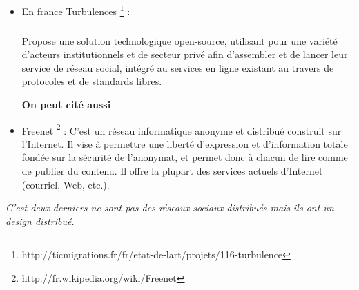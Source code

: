 \begin{itemize}
1) Tent vous permet de sauvegarder vos données dans une place dont vous avez le contrôle. 

2) Vous pouvez choisir un fournisseur d'hébergement ou lancer votre propre serveur.

3) Si vous souhaitez déplacer les hosts vous aurez vos données et relations.
\begin{itemize}
  \item tent utilise https et JSON pour transporter les posts entre les serveurs et les apps.
\item les entités sont les utilisateurs de tant il autorisent apps, établi des relations et lire/publier des posts les entités sont définie avec leur entité URL; https/http URL liée les métadata
\item chaque entité a 1 ou plusieurs serveur qui la représente.
\item posts sont les atomics unité de contenu dans tent chaque post est un JSON, ils ont des fichiers attacher.
\item APPS fourni des UI (user interface) pour tent.
\item tent c'est une machine readable JSON api les apps doivent être autorisée avec oauth2
\item relationShips : les entités établissent des relations lorsque il envoient des messages qui mentionnent d'autres entités. 

\end{itemize}
\subparagraph{}
Les fonctionnalités trouvées aussi sur les sites d'information communautaires comme \textit{hacker news} \footnote{http://thehackernews.com/} peuvent être reproduite avec tent, mais nécessairement architecturée d'une manière différente. les messages et les commentaires sont situé sur le serveur tent au lieu d'être regroupé sur un site unique ou base de donnée. 
\subparagraph{}
Les données sont stockées dans tent comme messages. Messages, comme les fichiers, sont tapés. Il ya un petit nombre de types de poste prévues par le protocole que les serveurs utilisent des tentes. Les développeurs sont libres de créer de nouveaux types de poste pour le contenu / stockage de données.

  \item En france Turbulences \footnote{http://ticmigrations.fr/fr/etat-de-lart/projets/116-turbulence} :
\subparagraph{}
 Propose une solution technologique open-source, utilisant pour une variété d'acteurs institutionnels et de secteur privé afin d'assembler et de lancer leur service de réseau social, intégré au services en ligne existant au travers de protocoles et de standards libres.

\textbf{On peut cité aussi }
\item Freenet \footnote{http://fr.wikipedia.org/wiki/Freenet} : C'est un réseau informatique anonyme et distribué construit sur l'Internet. Il vise à permettre une liberté d'expression et d'information totale fondée sur la sécurité de l'anonymat, et permet donc à chacun de lire comme de publier du contenu. Il offre la plupart des services actuels d'Internet (courriel, Web, etc.). 
\end{itemize}
\textit{C'est deux derniers ne sont pas des réseaux sociaux distribués mais ils ont un design distribué. }

